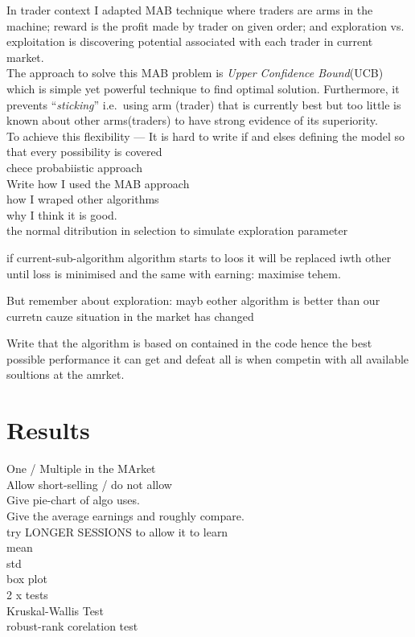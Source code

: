 \documentclass{llncs}
\begin{document}
In trader context I adapted MAB technique where traders are arms in the machine; reward is the profit made by trader on given order; and exploration vs. exploitation is discovering potential associated with each trader in current market.\\
The approach to solve this MAB problem is \emph{Upper Confidence Bound}(UCB)~\cite{white2012bandit} which is simple yet powerful technique to find optimal solution. Furthermore, it prevents ``\emph{sticking}'' i.e.\ using arm (trader) that is currently best but too little is known about other arms(traders) to  have strong evidence of its superiority.\\

To achieve this flexibility --- It is hard to write if and elses defining the model so that every possibility is covered\\
chece probabiistic approach\\

Write how I used the MAB approach\\
  how I wraped other algorithms\\
  why I think it is good.\\

the normal ditribution in selection to simulate exploration parameter


if current-sub-algorithm algorithm starts to loos it will be replaced iwth other until loss is minimised and the same with earning: maximise tehem.

But remember about exploration: mayb eother algorithm is better than our curretn cauze situation in the market has changed

Write that the algorithm is based on contained in the code hence the best possible performance it can get and defeat all is when competin with all available soultions at the amrket.\\

\section{Results}
One / Multiple in the MArket\\
Allow short-selling / do not allow\\

Give pie-chart of algo uses.\\
Give the average earnings and roughly compare.\\
try LONGER SESSIONS to allow it to learn\\
mean\\
std\\
box plot\\
2 x tests\\
Kruskal-Wallis Test\\
robust-rank corelation test
\end{document}
